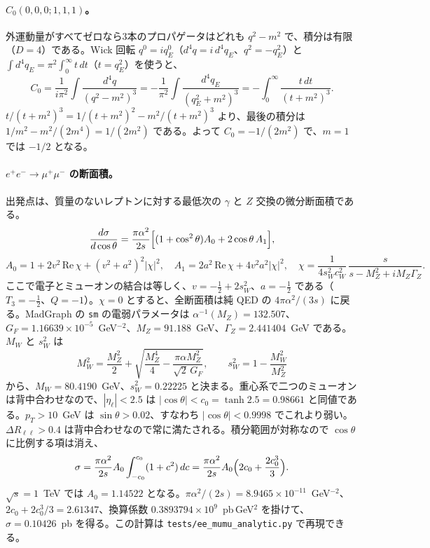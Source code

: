 \documentclass[a4paper,10pt]{ltjsarticle}
\begin{document}
\paragraph{$C_0(0,0,0;1,1,1)$。}外運動量がすべてゼロなら3本のプロパゲータはどれも $q^2-m^2$ で、積分は有限（$D=4$）である。Wick 回転 $q^0=iq_E^0$（$d^4q=i\,d^4q_E$、$q^2=-q_E^2$）と $\int d^4q_E=\pi^2\int_0^\infty t\,dt$（$t=q_E^2$）を使うと、
\begin{equation}
C_0=\frac{1}{i\pi^2}\int\frac{d^4q}{(q^2-m^2)^3}=-\frac{1}{\pi^2}\int\frac{d^4q_E}{(q_E^2+m^2)^3}=-\int_0^\infty\frac{t\,dt}{(t+m^2)^3}.
\end{equation}
$t/(t+m^2)^3=1/(t+m^2)^2-m^2/(t+m^2)^3$ より、最後の積分は $1/m^2-m^2/(2m^4)=1/(2m^2)$ である。よって $C_0=-1/(2m^2)$ で、$m=1$ では $-1/2$ となる。

\paragraph{$e^+e^-\to\mu^+\mu^-$ の断面積。}出発点は、質量のないレプトンに対する最低次の $\gamma$ と $Z$ 交換の微分断面積である。
\begin{equation}
\frac{d\sigma}{d\cos\theta}=\frac{\pi\alpha^2}{2s}\Bigl[(1+\cos^2\theta)A_0+2\cos\theta\,A_1\Bigr],
\end{equation}
\begin{equation}
A_0=1+2v^2\,\mathrm{Re}\,\chi+(v^2+a^2)^2|\chi|^2,\quad
A_1=2a^2\,\mathrm{Re}\,\chi+4v^2a^2|\chi|^2,\quad
\chi=\frac{1}{4s_W^2c_W^2}\,\frac{s}{s-M_Z^2+iM_Z\Gamma_Z}.
\end{equation}
ここで電子とミューオンの結合は等しく、$v=-\tfrac12+2s_W^2$、$a=-\tfrac12$ である（$T_3=-\tfrac12$、$Q=-1$）。$\chi=0$ とすると、全断面積は純 QED の $4\pi\alpha^2/(3s)$ に戻る。MadGraph の \texttt{sm} の電弱パラメータは $\alpha^{-1}(M_Z)=132.507$、$G_F=1.16639\times10^{-5}$~GeV$^{-2}$、$M_Z=91.188$~GeV、$\Gamma_Z=2.441404$~GeV である。$M_W$ と $s_W^2$ は
\begin{equation}
M_W^2=\frac{M_Z^2}{2}+\sqrt{\frac{M_Z^4}{4}-\frac{\pi\alpha M_Z^2}{\sqrt2\,G_F}},\qquad s_W^2=1-\frac{M_W^2}{M_Z^2}
\end{equation}
から、$M_W=80.4190$~GeV、$s_W^2=0.22225$ と決まる。重心系で二つのミューオンは背中合わせなので、$|\eta_\ell|<2.5$ は $|\cos\theta|<c_0=\tanh2.5=0.98661$ と同値である。$p_T>10$~GeV は $\sin\theta>0.02$、すなわち $|\cos\theta|<0.9998$ でこれより弱い。$\Delta R_{\ell\ell}>0.4$ は背中合わせなので常に満たされる。積分範囲が対称なので $\cos\theta$ に比例する項は消え、
\begin{equation}
\sigma=\frac{\pi\alpha^2}{2s}A_0\int_{-c_0}^{c_0}(1+c^2)\,dc=\frac{\pi\alpha^2}{2s}A_0\Bigl(2c_0+\frac{2c_0^3}{3}\Bigr).
\end{equation}
$\sqrt s=1$~TeV では $A_0=1.14522$ となる。$\pi\alpha^2/(2s)=8.9465\times10^{-11}$~GeV$^{-2}$、$2c_0+2c_0^3/3=2.61347$、換算係数 $0.3893794\times10^9$~pb\,GeV$^2$ を掛けて、$\sigma=0.10426$~pb を得る。この計算は \nolinkurl{tests/ee_mumu_analytic.py} で再現できる。
\end{document}
